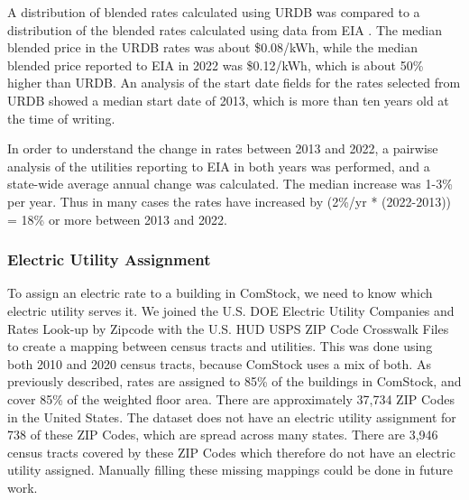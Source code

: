 A distribution of blended rates calculated using URDB was compared to a distribution of the blended rates calculated using data from EIA \citep{eia_electricity}. The median blended price in the URDB rates was about \$0.08/kWh, while the median blended price reported to EIA in 2022 was \$0.12/kWh, which is about 50\% higher than URDB. An analysis of the start date fields for the rates selected from URDB showed a median start date of 2013, which is more than ten years old at the time of writing.

In order to understand the change in rates between 2013 and 2022, a pairwise analysis of the utilities reporting to EIA \citep{eia_electricity} in both years was performed, and a state-wide average annual change was calculated. The median increase was 1-3\% per year. Thus in many cases the rates have increased by (2\%/yr * (2022-2013)) = 18\% or more between 2013 and 2022.

\subsubsection{Electric Utility Assignment}
To assign an electric rate to a building in ComStock, we need to know which electric utility serves it. We joined the U.S. DOE Electric Utility Companies and Rates Look-up by Zipcode \citep{zip_to_util} with the U.S. HUD USPS ZIP Code Crosswalk Files \citep{tract_to_zip} to create a mapping between census tracts and utilities. This was done using both 2010 and 2020 census tracts, because ComStock uses a mix of both.
As previously described, rates are assigned to 85\% of the buildings in ComStock, and cover 85\% of the weighted floor area. There are approximately 37,734 ZIP Codes in the United States. The dataset does not have an electric utility assignment for 738 of these ZIP Codes, which are spread across many states. There are 3,946 census tracts covered by these ZIP Codes which therefore do not have an electric utility assigned. Manually filling these missing mappings could be done in future work.

